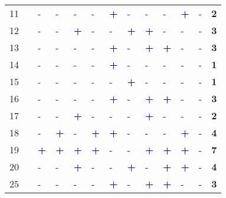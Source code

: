 \begin{longtable}{p{0.5cm}p{4.6cm}p{0.3cm}p{0.3cm}p{0.3cm}p{0.3cm}p{0.3cm}p{0.3cm}p{0.3cm}p{0.3cm}p{0.3cm}p{0.3cm}p{1cm}}
    \small{11} & \small{\textcite{baek_electric_2021}}\index{Baek, Kwangho|pagebf} & - & - & - & - & \textcolor{blue}{\textbf{+}} & - & - & - & \textcolor{blue}{\textbf{+}} & - & \textbf{2}\\
    \small{12} & \small{\textcite{balya_integration_2016}}\index{Balya, Manjurali|pagebf} & - & - & \textcolor{blue}{\textbf{+}} & - & - & \textcolor{blue}{\textbf{+}} & \textcolor{blue}{\textbf{+}} & - & - & - & \textbf{3}\\
    \small{13} & \small{\textcite{basu_planning_2021}}\index{Basu, Rounaq|pagebf} & - & - & - & - & \textcolor{blue}{\textbf{+}} & - & \textcolor{blue}{\textbf{+}} & \textcolor{blue}{\textbf{+}} & - & - & \textbf{3}\\
    \small{14} & \small{\textcite{bauer_influence_2021}}\index{Bauer, Marek|pagebf} & - & - & - & - & \textcolor{blue}{\textbf{+}} & - & - & - & - & - & \textbf{1}\\
    \small{15} & \small{\textcite{beale_integrating_2023}}\index{Beale, Kirsten|pagebf} & - & - & - & - & - & \textcolor{blue}{\textbf{+}} & - & - & - & - & \textbf{1}\\
    \small{16} & \small{\textcite{bearn_adaption_2018}}\index{Bearn, Cary|pagebf} & - & - & - & - & \textcolor{blue}{\textbf{+}} & - & \textcolor{blue}{\textbf{+}} & \textcolor{blue}{\textbf{+}} & - & - & \textbf{3}\\
    \small{17} & \small{\textcite{bechstein_cycling_2010}}\index{Bechstein, Eva|pagebf} & - & - & \textcolor{blue}{\textbf{+}} & - & - & - & \textcolor{blue}{\textbf{+}} & - & - & - & \textbf{2}\\
    \small{18} & \small{\textcite{bi_analysis_2021}}\index{Bi, Hui|pagebf} & - & \textcolor{blue}{\textbf{+}} & - & \textcolor{blue}{\textbf{+}} & \textcolor{blue}{\textbf{+}} & - & - & - & \textcolor{blue}{\textbf{+}} & - & \textbf{4}\\
    \small{19} & \small{\textcite{bocker_bike_2020}}\index{Böcker, Lars|pagebf} & \textcolor{blue}{\textbf{+}} & \textcolor{blue}{\textbf{+}} & \textcolor{blue}{\textbf{+}} & \textcolor{blue}{\textbf{+}} & - & - & \textcolor{blue}{\textbf{+}} & \textcolor{blue}{\textbf{+}} & \textcolor{blue}{\textbf{+}} & - & \textbf{7}\\
    \small{20} & \small{\textcite{bopp_examining_2015}}\index{Bopp, Melissa|pagebf} & - & - & \textcolor{blue}{\textbf{+}} & - & - & \textcolor{blue}{\textbf{+}} & - & \textcolor{blue}{\textbf{+}} & \textcolor{blue}{\textbf{+}} & - & \textbf{4}\\
    \small{25} & \small{\textcite{cao_e-scooter_2021}}\index{Cao, Zhejing|pagebf} & - & - & - & - & \textcolor{blue}{\textbf{+}} & - & \textcolor{blue}{\textbf{+}} & \textcolor{blue}{\textbf{+}} & - & - & \textbf{3}\\

\end{longtable}
